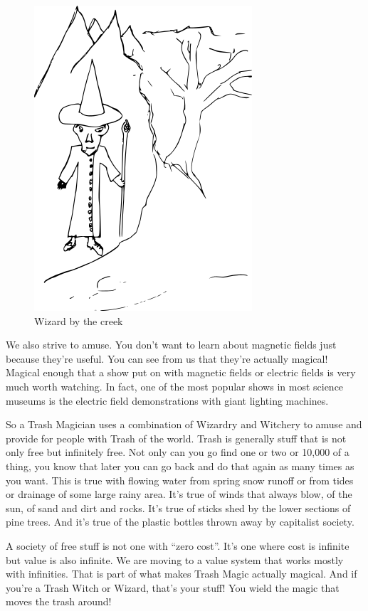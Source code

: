 \begin{figure}[htbp]
\centering
\includegraphics{images/wizardcartoon.png}
\caption{Wizard by the creek}
\end{figure}

We also strive to amuse. You don't want to learn about magnetic fields
just because they're useful. You can see from us that they're actually
magical! Magical enough that a show put on with magnetic fields or
electric fields is very much worth watching. In fact, one of the most
popular shows in most science museums is the electric field
demonstrations with giant lighting machines.

So a Trash Magician uses a combination of Wizardry and Witchery to amuse
and provide for people with Trash of the world. Trash is generally stuff
that is not only free but infinitely free. Not only can you go find one
or two or 10,000 of a thing, you know that later you can go back and do
that again as many times as you want. This is true with flowing water
from spring snow runoff or from tides or drainage of some large rainy
area. It's true of winds that always blow, of the sun, of sand and dirt
and rocks. It's true of sticks shed by the lower sections of pine trees.
And it's true of the plastic bottles thrown away by capitalist society.

A society of free stuff is not one with ``zero cost''. It's one where
cost is infinite but value is also infinite. We are moving to a value
system that works mostly with infinities. That is part of what makes
Trash Magic actually magical. And if you're a Trash Witch or Wizard,
that's your stuff! You wield the magic that moves the trash around!

